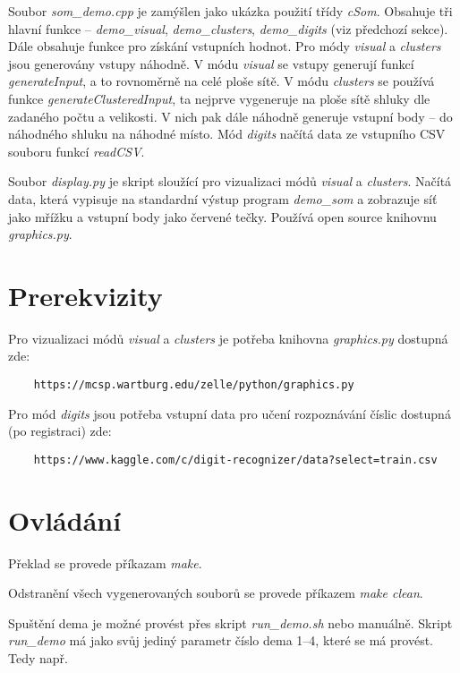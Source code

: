 \documentclass[11pt]{article}
\begin{document}
Soubor \textit{som\_demo.cpp} je zamýšlen jako ukázka použití třídy \textit{cSom}. Obsahuje tři hlavní funkce -- \textit{demo\_visual}, \textit{demo\_clusters}, \textit{demo\_digits} (viz předchozí sekce). Dále obsahuje funkce pro získání vstupních hodnot. Pro módy \textit{visual} a \textit{clusters} jsou generovány vstupy náhodně. V módu \textit{visual} se vstupy generují funkcí \textit{generateInput}, a to rovnoměrně na celé ploše sítě. V módu \textit{clusters} se používá funkce \textit{generateClusteredInput}, ta nejprve vygeneruje na ploše sítě shluky dle zadaného počtu a velikosti. V nich pak dále náhodně generuje vstupní body -- do náhodného shluku na náhodné místo. Mód \textit{digits} načítá data ze vstupního CSV souboru funkcí \textit{readCSV}.

Soubor \textit{display.py} je skript sloužící pro vizualizaci módů \textit{visual} a \textit{clusters}. Načítá data, která vypisuje na standardní výstup program \textit{demo\_som} a zobrazuje síť jako mřížku a vstupní body jako červené tečky. Používá open source knihovnu \textit{graphics.py}.

\section*{Prerekvizity}
Pro vizualizaci módů \textit{visual} a \textit{clusters} je potřeba knihovna \textit{graphics.py} dostupná zde:

\begin{verbatim}
	https://mcsp.wartburg.edu/zelle/python/graphics.py
\end{verbatim}

\noindent
Pro mód \textit{digits} jsou potřeba vstupní data pro učení rozpoznávání číslic dostupná (po registraci) zde:

\begin{verbatim}
	https://www.kaggle.com/c/digit-recognizer/data?select=train.csv
\end{verbatim}

\section*{Ovládání}
Překlad se provede příkazam \textit{make}.

\vspace{5pt}
\noindent
Odstranění všech vygenerovaných souborů se provede příkazem \textit{make clean}.
\vspace{5pt}

Spuštění dema je možné provést přes skript \textit{run\_demo.sh} nebo manuálně. Skript \textit{run\_demo} má jako svůj jediný parametr číslo dema 1--4, které se má provést. Tedy např. 
\end{document}

